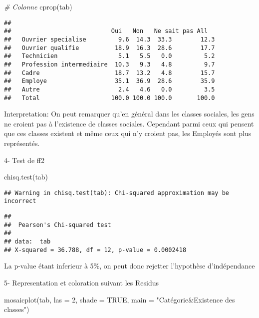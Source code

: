 \documentclass[
]{article}
\newenvironment{Shaded}{\begin{snugshade}}{\end{snugshade}}
\newcommand{\AttributeTok}[1]{\textcolor[rgb]{0.77,0.63,0.00}{#1}}
\newcommand{\CommentTok}[1]{\textcolor[rgb]{0.56,0.35,0.01}{\textit{#1}}}
\newcommand{\ConstantTok}[1]{\textcolor[rgb]{0.00,0.00,0.00}{#1}}
\newcommand{\DecValTok}[1]{\textcolor[rgb]{0.00,0.00,0.81}{#1}}
\newcommand{\FunctionTok}[1]{\textcolor[rgb]{0.00,0.00,0.00}{#1}}
\newcommand{\NormalTok}[1]{#1}
\newcommand{\StringTok}[1]{\textcolor[rgb]{0.31,0.60,0.02}{#1}}
\begin{document}
\begin{Shaded}
\begin{Highlighting}[]
\CommentTok{\# Colonne}
\FunctionTok{cprop}\NormalTok{(tab)}
\end{Highlighting}
\end{Shaded}

\begin{verbatim}
##                           
##                            Oui   Non   Ne sait pas All  
##   Ouvrier specialise         9.6  14.3  33.3        12.3
##   Ouvrier qualifie          18.9  16.3  28.6        17.7
##   Technicien                 5.1   5.5   0.0         5.2
##   Profession intermediaire  10.3   9.3   4.8         9.7
##   Cadre                     18.7  13.2   4.8        15.7
##   Employe                   35.1  36.9  28.6        35.9
##   Autre                      2.4   4.6   0.0         3.5
##   Total                    100.0 100.0 100.0       100.0
\end{verbatim}

Interpretation: On peut remarquer qu'en général dans les classes
sociales, les gens ne croient pas à l'existence de classes sociales.
Cependant parmi ceux qui pensent que ces classes existent et même ceux
qui n'y croient pas, les Employés sont plus représentés.

4- Test de ff2

\begin{Shaded}
\begin{Highlighting}[]
\FunctionTok{chisq.test}\NormalTok{(tab)}
\end{Highlighting}
\end{Shaded}

\begin{verbatim}
## Warning in chisq.test(tab): Chi-squared approximation may be incorrect
\end{verbatim}

\begin{verbatim}
## 
##  Pearson's Chi-squared test
## 
## data:  tab
## X-squared = 36.788, df = 12, p-value = 0.0002418
\end{verbatim}

La p-value étant inferieur à 5\%, on peut donc rejetter l'hypothèse
d'indépendance

5- Representation et coloration suivant les Residus

\begin{Shaded}
\begin{Highlighting}[]
\FunctionTok{mosaicplot}\NormalTok{(tab, }\AttributeTok{las =} \DecValTok{2}\NormalTok{, }\AttributeTok{shade =} \ConstantTok{TRUE}\NormalTok{, }\AttributeTok{main =} \StringTok{"Catégorie\&Existence des classes"}\NormalTok{)}
\end{Highlighting}
\end{Shaded}
\end{document}
